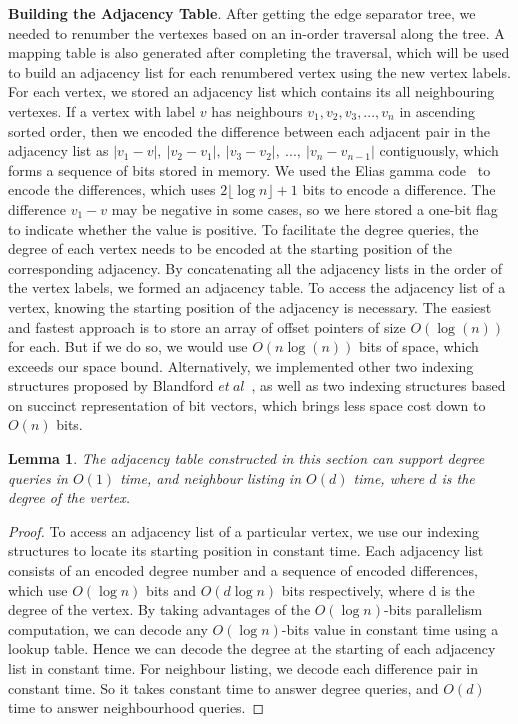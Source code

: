 \documentclass[12pt,glossary]{dalthesis}
\newtheorem{lemma}[theorem]{Lemma}
\begin{document}
\textbf{Building the Adjacency Table}. After getting the edge separator tree, we needed to renumber the vertexes based on an in-order traversal along the tree. A mapping table is also generated after completing the traversal, which will be used to build an adjacency list for each renumbered vertex using the new vertex labels. For each vertex, we stored an adjacency list which contains its all neighbouring vertexes. If a vertex with label $v$ has neighbours $v_{1}, v_{2}, v_{3}, ...,v_{n}$ in ascending sorted order, then we encoded the difference between each adjacent pair in the adjacency list as $|v_{1}-v|, \ |v_{2}-v_{1}|,\  |v_{3}-v_{2}|,\ ...,\ |v_{n}-v_{n-1}|$ contiguously, which forms a sequence of bits stored in memory. We used the Elias gamma code~\cite{Gamma} to encode the differences, which uses $2\lfloor \log n \rfloor + 1$ bits to encode a difference. The difference $v_{1} - v$ may be negative in some cases, so we here stored a one-bit flag to indicate whether the value is positive. To facilitate the degree queries, the degree of each vertex needs to be encoded at the starting position of the corresponding adjacency. By concatenating all the adjacency lists in the order of the vertex labels, we formed an adjacency table. To access the adjacency list of a vertex, knowing the starting position of the adjacency is necessary. The easiest and fastest approach is to store an array of offset pointers of size $O(\log (n))$ for each. But if we do so, we would use $O(n\log (n))$ bits of space, which exceeds our space bound. Alternatively, we implemented other two indexing structures proposed by Blandford $et \ al$~\cite{compact-representation}, as well as two indexing structures based on succinct representation of bit vectors, which brings less space cost down to $O(n)$ bits.

\bigskip
\begin{lemma}
The adjacency table constructed in this section can support degree queries in $O(1)$ time, and neighbour
listing in $O(d)$ time, where $d$ is the degree of the vertex.
\end{lemma}
\bigskip 
\begin{proof}
To access an adjacency list of a particular vertex, we use our indexing structures to locate its starting position in constant time. Each adjacency list consists of an encoded degree number and a sequence of encoded differences, which use $O(\log n)$ bits and $O(d\log n)$ bits respectively, where d is the degree of the vertex. By taking advantages of the $O(\log n)$-bits parallelism computation, we can decode any $O(\log n)$-bits value in constant time using a lookup table. Hence we can decode the degree at the starting of each adjacency list in constant time. For neighbour listing, we decode each difference pair in constant time. So it takes constant time to answer degree queries, and $O(d)$ time to answer neighbourhood queries.
\end{proof}
\end{document}
